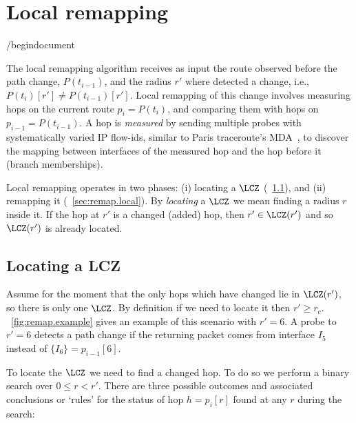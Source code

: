 \section{Local remapping}
\label{sec:remap}

\def\Pi{p_i}
\def\Pii{p_{i-1}}

/begin{document}

The local remapping algorithm receives as input the route observed
before the path change, $P(t_{i-1})$, and the radius $r'$ where
\dtrack{} detected a change, i.e., $P(t_i)[r'] \ne P(t_{i-1})[r']$.
Local remapping of this change involves measuring hops on the current
route $\Pi=P(t_i)$, and comparing them with hops on
$\Pii\!=\!P(t_{i-1})$.  A hop is \emph{measured} by sending multiple
probes with systematically varied IP flow-ids, similar to Paris
traceroute's MDA~\cite{veitch09balancer}, to discover the mapping
between interfaces of the measured hop and the hop before it (branch
memberships).

Local remapping operates in two phases:  (i)  locating a $\LCZ$
(\secstr~\ref{sec:remap.locate}), and (ii) remapping it
(\secstr~\ref{sec:remap.local}).  By \emph{locating} a $\LCZ$ we mean
finding a radius $r$ inside it.  If the hop at $r'$ is a changed (added)
hop, then $r'\in\LCZ(r')$ and so $\LCZ(r')$ is already located.



\subsection{Locating a LCZ}
\label{sec:remap.locate}

Assume for the moment that the only hops which have changed lie in
$\LCZ(r')$, so there is only one $\LCZ$.  By definition if we need to
locate it then $r'\ge r_c$.  \figstr~\ref{fig:remap.example} gives an
example of this scenario with $r'=6$.  A probe to $r'=6$ detects a path
change if the returning packet comes from interface $I_5$ instead of
$\{I_6\} = \Pii[6]$.

To locate the $\LCZ$ we need to find a changed hop.  To do so we perform
a binary search over  $0\le r <r'$.  There are three possible outcomes
and associated conclusions or `rules' for the status of hop $h =\Pi[r]$
found at any $r$ during the search:

